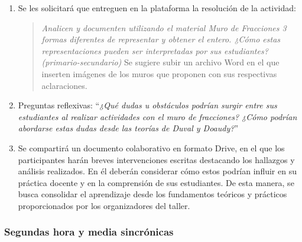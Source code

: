 \begin{enumerate}
	\item Se les solicitará que entreguen en la plataforma la resolución de la actividad:
	
	\begin{quote}
		\textit{Analicen y documenten utilizando el material Muro de Fracciones 3 formas diferentes de representar y obtener el entero. ¿Cómo estas representaciones pueden ser interpretadas por sus estudiantes? (primario-secundario)} Se sugiere subir un archivo Word en el que inserten imágenes de los muros que proponen con sus respectivas aclaraciones.
	\end{quote}
	
	\item Preguntas reflexivas: “\textit{¿Qué dudas u obstáculos podrían surgir entre sus estudiantes al realizar actividades con el muro de fracciones? ¿Cómo podrían abordarse estas dudas desde las teorías de Duval y Doaudy?}”
	
	\item Se compartirá un documento colaborativo en formato Drive, en el que los participantes harán breves intervenciones escritas destacando los hallazgos y análisis realizados. En él deberán considerar cómo estos podrían influir en su práctica docente y en la comprensión de sus estudiantes. De esta manera, se busca consolidar el aprendizaje desde los fundamentos teóricos y prácticos proporcionados por los organizadores del taller.
\end{enumerate}

\subsubsection{Segundas hora y media sincrónicas}

